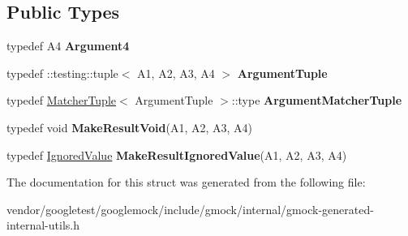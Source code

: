 \subsection*{Public Types}
\begin{DoxyCompactItemize}
\item 
typedef A4 {\bfseries Argument4}\hypertarget{structtesting_1_1internal_1_1Function_3_01R_07A1_00_01A2_00_01A3_00_01A4_08_4_ae5039423598ab0fecd4f594acbf34d85}{}\label{structtesting_1_1internal_1_1Function_3_01R_07A1_00_01A2_00_01A3_00_01A4_08_4_ae5039423598ab0fecd4f594acbf34d85}

\item 
typedef \+::testing\+::tuple$<$ A1, A2, A3, A4 $>$ {\bfseries Argument\+Tuple}\hypertarget{structtesting_1_1internal_1_1Function_3_01R_07A1_00_01A2_00_01A3_00_01A4_08_4_a8ad9e0ae57a766f80a9816ad45626812}{}\label{structtesting_1_1internal_1_1Function_3_01R_07A1_00_01A2_00_01A3_00_01A4_08_4_a8ad9e0ae57a766f80a9816ad45626812}

\item 
typedef \hyperlink{structtesting_1_1internal_1_1MatcherTuple}{Matcher\+Tuple}$<$ Argument\+Tuple $>$\+::type {\bfseries Argument\+Matcher\+Tuple}\hypertarget{structtesting_1_1internal_1_1Function_3_01R_07A1_00_01A2_00_01A3_00_01A4_08_4_a9524b18868ab632a90d4cb6917057a14}{}\label{structtesting_1_1internal_1_1Function_3_01R_07A1_00_01A2_00_01A3_00_01A4_08_4_a9524b18868ab632a90d4cb6917057a14}

\item 
typedef void {\bfseries Make\+Result\+Void}(A1, A2, A3, A4)\hypertarget{structtesting_1_1internal_1_1Function_3_01R_07A1_00_01A2_00_01A3_00_01A4_08_4_af7462da27e87a9d580e7f9748ebc5754}{}\label{structtesting_1_1internal_1_1Function_3_01R_07A1_00_01A2_00_01A3_00_01A4_08_4_af7462da27e87a9d580e7f9748ebc5754}

\item 
typedef \hyperlink{classtesting_1_1internal_1_1IgnoredValue}{Ignored\+Value} {\bfseries Make\+Result\+Ignored\+Value}(A1, A2, A3, A4)\hypertarget{structtesting_1_1internal_1_1Function_3_01R_07A1_00_01A2_00_01A3_00_01A4_08_4_a6736086d1c8ba25788add1e5180207f9}{}\label{structtesting_1_1internal_1_1Function_3_01R_07A1_00_01A2_00_01A3_00_01A4_08_4_a6736086d1c8ba25788add1e5180207f9}

\end{DoxyCompactItemize}


The documentation for this struct was generated from the following file\+:\begin{DoxyCompactItemize}
\item 
vendor/googletest/googlemock/include/gmock/internal/gmock-\/generated-\/internal-\/utils.\+h\end{DoxyCompactItemize}
